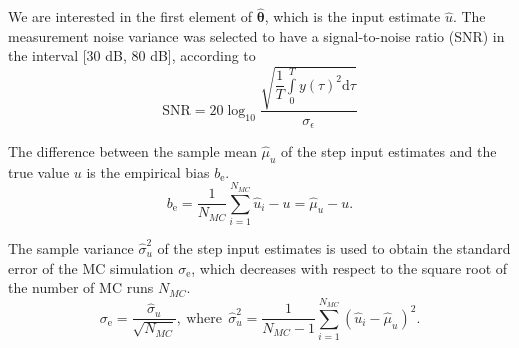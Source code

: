 We are interested in the first element of $\widehat{\bm{\theta}}$, which is the input estimate $\widehat{u}$.
The measurement noise variance was selected to have a signal-to-noise ratio (SNR) in the interval [30 dB, 80 dB], according to
\begin{equation} \mathrm{SNR} = 20 \log_{10}{ \dfrac{ \sqrt{ \dfrac{1}{T} \int\limits_{0}^{T}{ y(\tau)^2  \mathrm{d} \tau } } }{ \sigma_{ \epsilon }} } \end{equation} 

The difference between the sample mean $\widehat{\mu}_u$ of the step input estimates and the true value $u$ is the empirical bias $b_\mathrm{e}$.
\begin{equation} {b}_\mathrm{e} = \frac{1}{N_{MC}} \sum_{i=1}^{N_{MC}}{ \widehat{u}_i - u } = \widehat{\mu}_u - u.  \end{equation}

The sample variance $\widehat{\sigma}_u^2$ of the step input estimates is used to obtain the standard error of the MC simulation $\sigma_\mathrm{e}$, which decreases with respect to the square root of the number of MC runs $N_{MC}$. 
\begin{equation}  \sigma_\mathrm{e} = \frac{\widehat{\sigma}_u}{\sqrt{N_{MC}}}, \ \mathrm{where} \ \ \widehat{\sigma}_u^2 = \frac{1}{N_{MC}-1} \sum_{i=1}^{N_{MC}}{ \left( \widehat{u}_i - \widehat{\mu}_u \right)^2 } . \end{equation}


